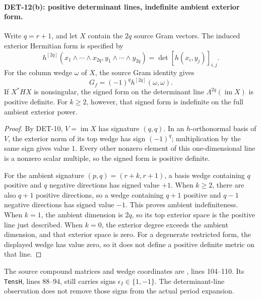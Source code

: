 \documentclass[11pt,a4paper]{article}
\newcommand{\fid}[1]{\textsf{#1}}
\begin{document}
\paragraph{DET-12(b): positive determinant lines, indefinite ambient exterior form.}
Write \(q=r+1\), and let \(X\) contain the \(2q\) source Gram vectors.
The induced exterior Hermitian form is specified by
\[
 h^{[2q]}(x_1\wedge\cdots\wedge x_{2q},
          y_1\wedge\cdots\wedge y_{2q})
 =\det[h(x_i,y_j)]_{i,j}.
\]
For the column wedge \(\omega\) of \(X\), the source Gram identity gives
\[
 G_f=(-1)^q h^{[2q]}(\omega,\omega).
\]
If \(X^*HX\) is nonsingular, the signed form on the determinant line
\(\Lambda^{2q}(\operatorname{im}X)\) is positive definite. For \(k\ge2\),
however, that signed form is indefinite on the full ambient exterior
power.
\begin{proof}
By \fid{DET-10}, \(V=\operatorname{im}X\) has signature \((q,q)\).
In an \(h\)-orthonormal basis of \(V\), the exterior norm of its top
wedge has sign \((-1)^q\); multiplication by the same sign gives
value \(1\). Every other nonzero element of this one-dimensional line
is a nonzero scalar multiple, so the signed form is positive definite.

For the ambient signature \((p,q)=(r+k,r+1)\), a basis wedge
containing \(q\) positive and \(q\) negative directions has signed
value \(+1\). When \(k\ge2\), there are also \(q+1\) positive directions,
so a wedge containing \(q+1\) positive and \(q-1\) negative directions
has signed value \(-1\). This proves ambient indefiniteness.
When \(k=1\), the ambient dimension is \(2q\), so its top exterior
space is the positive line just described. When \(k=0\), the exterior
degree exceeds the ambient dimension, and that exterior space is zero.
For a degenerate restricted form, the displayed wedge has value zero,
so it does not define a positive definite metric on that line.
\end{proof}
The source compound matrices and wedge coordinates are
,
lines 104--110. Its \texttt{TensH}, lines 88--94, still carries
signs \(\epsilon_I\in\{1,-1\}\). The determinant-line observation
does not remove those signs from the actual period expansion.
\end{document}
